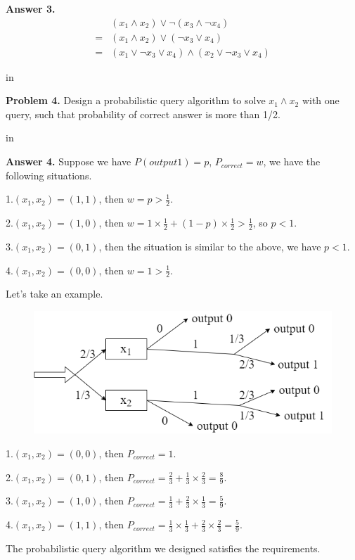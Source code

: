 \documentclass[11pt]{article}
\begin{document}
{\bf Answer 3.}
$$
\begin{aligned}
	&(x_1 \wedge x_2)\vee \neg(x_3 \wedge \neg x_4)\\
	=&(x_1 \wedge x_2) \vee (\neg x_3 \vee x_4)\\
	=&(x_1\vee \neg x_3 \vee x_4) \wedge (x_2\vee \neg x_3 \vee x_4)
\end{aligned}
$$

 in

{\bf Problem 4.} Design a probabilistic query algorithm to solve $x_1 \wedge x_2 $ with one query, such that probability of correct answer is more than 1/2.

 in

{\bf Answer 4.} Suppose we have $P(output 1)=p$, $P_{correct}=w$, we have the following situations.

1.$(x_1,x_2)=(1,1)$, then $w=p>\frac{1}{2}$.

2.$(x_1,x_2)=(1,0)$, then $w=1\times \frac{1}{2}+(1-p)\times \frac{1}{2}>\frac{1}{2}$, so $p<1$.

3.$(x_1,x_2)=(0,1)$, then the situation is similar to the above, we have $p<1$.

4.$(x_1,x_2)=(0,0)$, then $w=1>\frac{1}{2}$.

Let's take an example.
\begin{figure}[ht]
	\centering
	\includegraphics[scale=0.5]{example.png}
\end{figure}

1.$(x_1,x_2)=(0,0)$, then $P_{correct}=1$.

2.$(x_1,x_2)=(0,1)$, then $P_{correct}=\frac{2}{3}+\frac{1}{3}\times\frac{2}{3}=\frac{8}{9}$.

3.$(x_1,x_2)=(1,0)$, then $P_{correct}=\frac{1}{3}+\frac{2}{3}\times\frac{1}{3}=\frac{5}{9}$.

4.$(x_1,x_2)=(1,1)$, then $P_{correct}=\frac{1}{3}\times\frac{1}{3}+\frac{2}{3}\times\frac{2}{3}=\frac{5}{9}$.

The probabilistic query algorithm we designed satisfies the requirements.
\end{document}

